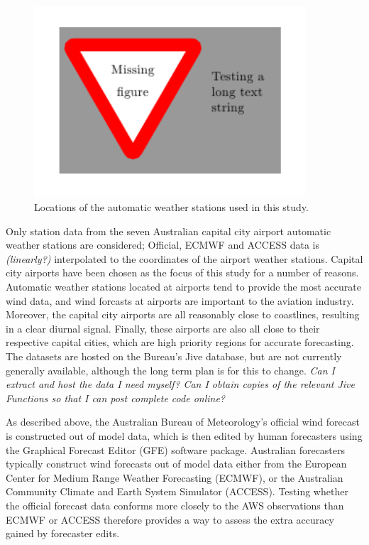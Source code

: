 \documentclass[alpha-refs]{wiley-article}
\begin{document}
\begin{figure}
\centering
\includegraphics[keepaspectratio=true,width=0.90\textwidth]{figure_placeholder.png}
\caption{Locations of the automatic weather stations used in this study.}
\label{Fig:station_map}
\end{figure}

Only station data from the seven Australian capital city airport automatic weather stations are considered; Official, ECMWF and ACCESS  data is \textit{(linearly?)} interpolated to the coordinates of the airport weather stations. Capital city airports have been chosen as the focus of this study for a number of reasons. Automatic weather stations located at airports tend to provide the most accurate wind data, and wind forcasts at airports are important to the aviation industry. Moreover, the capital city airports are all reasonably close to coastlines, resulting in a clear diurnal signal. Finally, these airports are also all close to their respective capital cities, which are high priority regions for accurate forecasting. The datasets are hosted on the Bureau's Jive database, but are not currently generally available, although the long term plan is for this to change. \textit{Can I extract and host the data I need myself? Can I obtain copies of the relevant Jive Functions so that I can post complete code online?}

As described above, the Australian Bureau of Meteorology's official wind forecast is constructed out of model data, which is then edited by human forecasters using the Graphical Forecast Editor (GFE) software package. Australian forecasters typically construct wind forecasts out of model data either from the European Center for Medium Range Weather Forecasting (ECMWF), or the Australian Community Climate and Earth System Simulator (ACCESS). Testing whether the official forecast data conforms more closely to the AWS observations than ECMWF or ACCESS therefore provides a way to assess the extra accuracy gained by forecaster edits.
\end{document}

